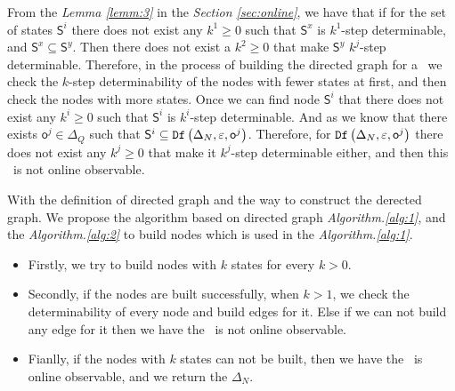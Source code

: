 From the {\em Lemma \ref{lemm:3}} in the {\em Section \ref{sec:online}}, we have that if for the set of states $\mathsf{S}^i$ there does not exist any $k^{1}\ge 0$ such that $\mathsf{S}^{x}$ is $k^{1}$-step determinable, and $\mathsf{S}^{x}\subseteq \mathsf{S}^{y}$. Then there does not exist a $k^{2}\ge 0$ that make $\mathsf{S}^{y}$ $k^{j}$-step determinable. Therefore, in the process of building the directed graph for a \BCN\ we check the $k$-step determinability of the nodes with fewer states at first, and then check the nodes with more states. Once we can find node $\mathsf{S}^i$ that there does not exist any $k^{i}\ge0$ such that $\mathsf{S}^{i}$ is $k^{i}$-step determinable. And as we know that there exists $\mathsf{o}^{j}\in \Delta_Q$ such that $\mathsf{S}^{i}\subseteq {\tt Df}\left(\Delta_N,\varepsilon, \mathsf{o}^{j}\right)$. Therefore, for ${\tt Df}\left(\Delta_N,\varepsilon, \mathsf{o}^{j}\right)$ there does not exist any $k^{j}\ge 0$ that make it $k^{j}$-step determinable either, and then this \BCN\ is not online observable. %

With the definition of directed graph and the way to construct the derected graph. We propose the algorithm based on directed graph {\em Algorithm.\ref{alg:1}}, and the {\em Algorithm.\ref{alg:2}} to build nodes which is used in the {\em Algorithm.\ref{alg:1}}.

\begin{itemize}
\item  Firstly, we try to build nodes with $k$ states for every $k>0$.
\item Secondly, if the nodes are built successfully, when $k>1$, we check the determinability of every node and build edges for it. Else if we can not build any edge for it then we have the \BCN\ is not online observable.
\item Fianlly, if the nodes with $k$ states can not be built, then we have the \BCN\ is online observable, and we return the $\Delta_N$.
 \end{itemize}

